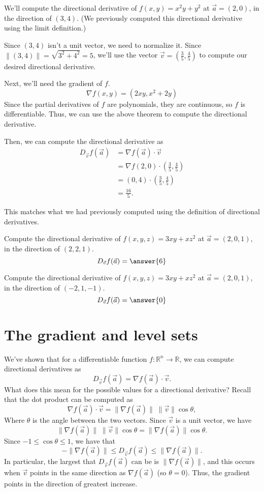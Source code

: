 \documentclass{ximera}
\begin{document}
\begin{example}
We'll compute the directional derivative of $f(x,y) = x^2y+y^2$ at $\vec{a}=(2,0)$, in the direction of $(3,4)$. (We previously computed this directional derivative using the limit definition.)

Since $(3,4)$ isn't a unit vector, we need to normalize it. Since $\|(3,4)\| = \sqrt{3^2+4^2}=5$, we'll use the vector $\vec{v}=\left(\frac{3}{5},\frac{4}{5}\right)$ to compute our desired directional derivative.

Next, we'll need the gradient of $f$.
\[
\nabla f(x,y) = (2xy, x^2+2y)
\]
Since the partial derivatives of $f$ are polynomials, they are continuous, so $f$ is differentiable. Thus, we can use the above theorem to compute the directional derivative.

Then, we can compute the directional derivative as
\begin{align*}
D_{\vec{v}}f(\vec{a}) &= \nabla f(\vec{a})\cdot \vec{v}\\
&= \nabla f(2,0)\cdot \left(\frac{3}{5},\frac{4}{5}\right)\\
&= (0,4)\cdot \left(\frac{3}{5},\frac{4}{5}\right)\\
&= \frac{16}{5}.
\end{align*}

This matches what we had previously computed using the definition of directional derivatives.
\end{example}

\begin{problem}
Compute the directional derivative of $f(x,y,z) = 3xy+xz^2$ at $\vec{a}=(2,0,1)$, in the direction of $(2, 2, 1)$.
\[
D_{\vec{v}}f(\vec{a}) = \answer{6}
\]

Compute the directional derivative of $f(x,y,z) = 3xy+xz^2$ at $\vec{a}=(2,0,1)$, in the direction of $(-2,1,-1)$.
\[
D_{\vec{v}}f(\vec{a}) = \answer{0}
\]
\end{problem}

\section*{The gradient and level sets}

We've shown that for a differentiable function $f:\mathbb{R}^n\rightarrow\mathbb{R}$, we can compute directional derivatives as
\[
D_{\vec{v}}f(\vec{a}) = \nabla f(\vec{a})\cdot \vec{v}.
\]
What does this mean for the possible values for a directional derivative? Recall that the dot product can be computed as
\[
\nabla f(\vec{a})\cdot \vec{v} = \|\nabla f(\vec{a})\|\;\|\vec{v}\|\cos\theta,
\]
Where $\theta$ is the angle between the two vectors. Since $\vec{v}$ is a unit vector, we have
\[
\|\nabla f(\vec{a})\|\;\|\vec{v}\|\cos\theta = \|\nabla f(\vec{a})\|\cos\theta.
\]
Since $-1\leq \cos\theta \leq 1$, we have that
\[
-\|\nabla f(\vec{a})\|\leq D_{\vec{v}}f(\vec{a})\leq \|\nabla f(\vec{a})\|.
\]
In particular, the largest that $D_{\vec{v}}f(\vec{a})$ can be is $\|\nabla f(\vec{a})\|$, and this occurs when $\vec{v}$ points in the same direction as $\nabla f(\vec{a})$ (so $\theta = 0$). Thus, the gradient points in the direction of greatest increase.
\end{document}
